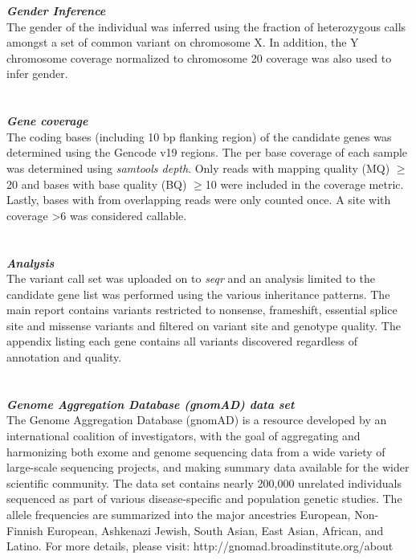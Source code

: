 {\large \textbf{\textit{Gender Inference}}}
\\
The gender of the individual was inferred using the fraction of heterozygous calls amongst a set of common variant on chromosome X. In addition, the Y chromosome coverage 
normalized to chromosome 20 coverage was also used to infer gender.
\\ \\ \\
{\large \textbf{\textit{Gene coverage}}}
\\
The coding bases (including 10 bp flanking region) of the candidate genes was determined using the Gencode v19 regions. The per base coverage of each
sample was determined using \textit{samtools depth}. Only reads with mapping quality (MQ) $\geq$20 and bases with base quality (BQ) $\geq$10
were included in the coverage metric. Lastly, bases with from overlapping reads were only counted once. A site with coverage \textgreater6 was considered
callable.  
\\ \\ \\
{\large \textbf{\textit{Analysis}}}
\\
The variant call set was uploaded on to \textit{seqr} and an analysis limited to the candidate gene list was performed using the various 
inheritance patterns. The main report contains variants restricted to nonsense, frameshift, essential splice site and missense variants and filtered on variant site and genotype quality. The appendix listing each gene contains all variants discovered regardless of annotation and quality.
\\ \\ \\
{\large \textbf{\textit{Genome Aggregation Database (gnomAD) data set}}}
\\
The Genome Aggregation Database (gnomAD) is a resource developed by an international coalition of investigators, with the goal of aggregating and harmonizing both exome and genome sequencing data from a wide variety of large-scale sequencing projects, and making summary data available for the wider scientific community. The data set contains nearly 200,000 unrelated individuals sequenced as part of various disease-specific and population genetic studies. The allele frequencies are summarized into the major ancestries European, Non-Finnish European, Ashkenazi Jewish,  South Asian, East Asian, African, and Latino. For more details, please visit: http://gnomad.broadinstitute.org/about
\\ \\ \\

